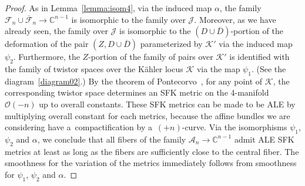 \begin{proof}
As in Lemma~\ref{lemma:isom4}, via the induced map $\alpha$, the family $\mathscr F_n\cup\overline{\mathscr
F}_n\to\mathbb{C}^{n-1}$ is isomorphic to the family over $\mathscr J$.
Moreover, as we have already seen, the family over $\mathscr J$ is isomorphic to the $(D\cup\overline D)$-portion of the
deformation of the pair $(Z,D\cup\overline D)$ parameterized by $\mathscr K'$ via the induced map $\psi_2$.
Furthermore, the $Z$-portion of the family of pairs over $\mathscr K'$ is identif\/ied with the family of twistor spaces
over the K\"ahler locus $\mathscr K$ via the map $\psi_1$.
(See the diagram~\eqref{diagram02}.) By the theorem of Pontecorvo~\cite{Pont92}, for any point of $\mathscr K$, the
corresponding twistor space determines an SFK metric on the 4-manifold $\mathscr O(-n)$ up to overall constants.
These SFK metrics can be made to be ALE by multiplying overall constant for each metrics, because the af\/f\/ine bundles
we are considering have a~compactif\/ication by a~$(+n)$-curve.
Via the isomorphisms $\psi_1$, $\psi_2$ and $\alpha$, we conclude that all f\/ibers of the family $\mathscr
A_n\to\mathbb{C}^{n-1}$ admit ALE SFK metrics at least as long as the f\/ibers are suf\/f\/iciently close to the central f\/iber.
The smoothness for the variation of the metrics immediately follows from smoothness for $\psi_1$, $\psi_2$ and $\alpha$.
\end{proof}
